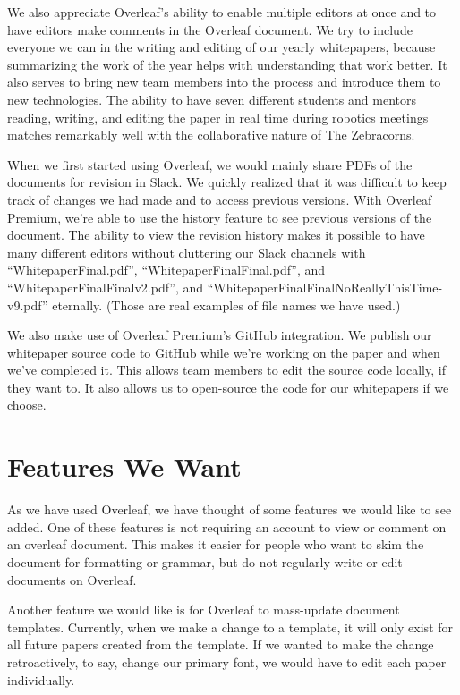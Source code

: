 \documentclass{zebracorns}
\begin{document}
We also appreciate Overleaf's ability to enable multiple editors at once and to have editors make comments in the Overleaf document. We try to include everyone we can in the writing and editing of our yearly whitepapers, because summarizing the work of the year helps with understanding that work better. It also serves to bring new team members into the process and introduce them to new technologies. The ability to have seven different students and mentors reading, writing, and editing the paper in real time during robotics meetings  matches remarkably well with the collaborative nature of The Zebracorns. 

When we first started using Overleaf, we would mainly share PDFs of the documents for revision in Slack. We quickly realized that it was difficult to keep track of changes we had made and to access previous versions. With Overleaf Premium, we're able to use the history feature to see previous versions of the document. The ability to view the revision history makes it possible to have many different editors without cluttering our Slack channels with ``WhitepaperFinal.pdf'', ``WhitepaperFinalFinal.pdf'', and ``WhitepaperFinalFinalv2.pdf'', and
``WhitepaperFinalFinalNoReallyThisTime-v9.pdf'' eternally. (Those are real examples of file names we have used.)

We also make use of Overleaf Premium's GitHub integration. We publish our whitepaper source code to GitHub while we're working on the paper and when we've completed it. This allows team members to edit the source code locally, if they want to. It also allows us to open-source the code for our whitepapers if we choose.

\section{Features We Want}
As we have used Overleaf, we have thought of some features we would like to see added. One of these features is not requiring an account to view or comment on an overleaf document. This makes it easier for people who want to skim the document for formatting or grammar, but do not regularly write or edit documents on Overleaf.

Another feature we would like is for Overleaf to mass-update document templates. Currently, when we make a change to a template, it will only exist for all future papers created from the template. If we wanted to make the change retroactively, to say, change our primary font, we would have to edit each paper individually. 
\end{document}
